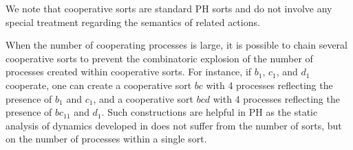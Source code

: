 \begin{comment}
\begin{figure}[p]
\centering
\scalebox{1.3}{
\begin{tikzpicture}
\path[use as bounding box] (-4,-1.9) rectangle (4.5,3.9);
%
\TSort{(0,0)}{a}{3}{l}
\TSort{(3, 3)}{b}{2}{t}
\TSort{(3,-1)}{c}{2}{b}
%
\TSetTick{bc}{0}{00}
\TSetTick{bc}{1}{01}
\TSetTick{bc}{2}{10}
\TSetTick{bc}{3}{11}
\TSort{(-3,-0.5)}{bc}{4}{l}
%
\THit{bc_3}{}{a_1}{.north west}{a_2}
\THit{bc_0}{}{a_1}{.south west}{a_0}
\path[bounce]
\TBounce{a_1}{bend left}{a_2}{.south west}
\TBounce{a_1}{bend right}{a_0}{.north west}
;
%
\THit{b_0}{}{a_2}{.east}{a_1}
\THit{b_1}{}{a_0}{.north east}{a_1}
\path[bounce]
\TBounce{a_2}{bend left}{a_1}{.north east}
\TBounce{a_0}{bend right=20}{a_1}{.south}
;
%
\THit{c_0}{bend right}{a_2}{.south east}{a_1}
\THit{c_1}{bend right}{a_0}{.east}{a_1}
\path[bounce]
\TBounce{a_2}{bend left=20}{a_1}{.north}
\TBounce{a_0}{bend right=30}{a_1}{.south east}
;
%
\path[dashed,hit]
	(2,-1.3) edge[bend left=10] (-2.3,-0.7)
	(2.2, 3.3) edge[bend right=10] (-2.3,3)
;
%
\THit{a_2}{bend left,out=40,in=80}{b_1}{.north west}{b_0}
\path[bounce, bend right]
\TBounce{b_1}{}{b_0}{.east}
;
%
\end{tikzpicture}
}
%
\caption{\label{fig:runningPH-2}
PH resulting from the refinement of the one in \pref{fig:runningPH-1} by the
specification of several cooperations.
The actions from $b$ and $c$ to the cooperative sort $bc$ are identical to those defined in
\pref{fig:PH-cooperativity} and are represented here by a single dashed arc.
}
\end{figure}
\end{comment}

We note that cooperative sorts are standard PH sorts and do not involve any
special treatment regarding the semantics of related actions.

When the number of cooperating processes is large, it is possible to chain several cooperative sorts
to prevent the combinatoric explosion of the number of processes created within cooperative sorts.
For instance, if $b_1$, $c_1$, and $d_1$ cooperate, one can create a cooperative sort $bc$ with 4
processes reflecting the presence of $b_1$ and $c_1$, and a cooperative sort $bcd$ with 4 processes
reflecting the presence of $bc_{11}$ and $d_1$.  Such constructions are helpful in PH
as the static analysis of dynamics developed in \cite{PMR12-MSCS} does not suffer from the number of
sorts, but on the number of processes within a single sort.

